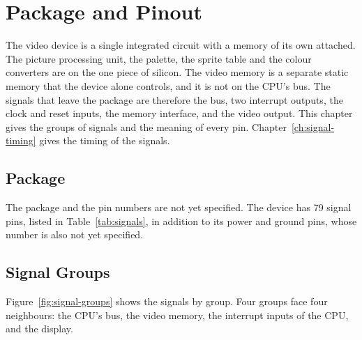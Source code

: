 \chapter{Package and Pinout}
\label{ch:package}

The video device is a single integrated circuit with a memory of its own attached. The picture processing unit, the
palette, the sprite table and the colour converters are on the one piece of silicon. The video memory is a separate
static memory that the device alone controls, and it is not on the CPU's bus. The signals that leave the package are
therefore the bus, two interrupt outputs, the clock and reset inputs, the memory interface, and the video output. This
chapter gives the groups of signals and the meaning of every pin. Chapter~\ref{ch:signal-timing} gives the timing of
the signals.

\section{Package}

The package and the pin numbers are not yet specified. The device has 79 signal pins, listed in
Table~\ref{tab:signals}, in addition to its power and ground pins, whose number is also not yet specified.

\section{Signal Groups}

Figure~\ref{fig:signal-groups} shows the signals by group. Four groups face four neighbours: the CPU's bus, the video
memory, the interrupt inputs of the CPU, and the display.

